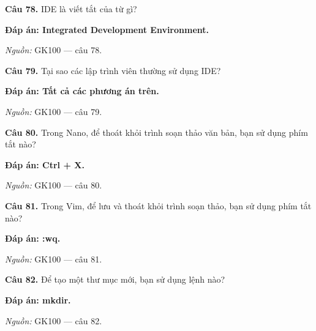\documentclass[11pt,a4paper]{article}
\begin{document}
\textbf{Câu 78.} IDE là viết tắt của từ gì?\par
{\color{answer}\textbf{Đáp án: Integrated Development Environment.}}\par
{\footnotesize\color{sourcegray}\textit{Nguồn:} GK100 — câu 78.\par}
\vspace{3pt}\par\noindent{\color{black!18}\rule{\linewidth}{0.3pt}}\par\medskip

\textbf{Câu 79.} Tại sao các lập trình viên thường sử dụng IDE?\par
{\color{answer}\textbf{Đáp án: Tất cả các phương án trên.}}\par
{\footnotesize\color{sourcegray}\textit{Nguồn:} GK100 — câu 79.\par}
\vspace{3pt}\par\noindent{\color{black!18}\rule{\linewidth}{0.3pt}}\par\medskip

\textbf{Câu 80.} Trong Nano, để thoát khỏi trình soạn thảo văn bản, bạn sử dụng phím tắt nào?\par
{\color{answer}\textbf{Đáp án: Ctrl + X.}}\par
{\footnotesize\color{sourcegray}\textit{Nguồn:} GK100 — câu 80.\par}
\vspace{3pt}\par\noindent{\color{black!18}\rule{\linewidth}{0.3pt}}\par\medskip

\textbf{Câu 81.} Trong Vim, để lưu và thoát khỏi trình soạn thảo, bạn sử dụng phím tắt nào?\par
{\color{answer}\textbf{Đáp án: :wq.}}\par
{\footnotesize\color{sourcegray}\textit{Nguồn:} GK100 — câu 81.\par}
\vspace{3pt}\par\noindent{\color{black!18}\rule{\linewidth}{0.3pt}}\par\medskip

\textbf{Câu 82.} Để tạo một thư mục mới, bạn sử dụng lệnh nào?\par
{\color{answer}\textbf{Đáp án: mkdir.}}\par
{\footnotesize\color{sourcegray}\textit{Nguồn:} GK100 — câu 82.\par}
\vspace{3pt}\par\noindent{\color{black!18}\rule{\linewidth}{0.3pt}}\par\medskip
\end{document}
